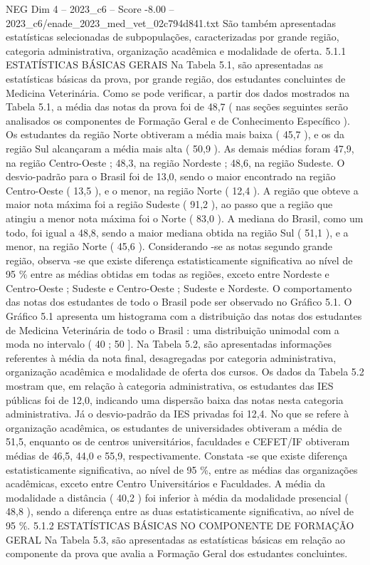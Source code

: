 \begin{textsample}{NEG Dim 4 – 2023\_c6 – Score -8.00 – 2023\_c6/enade\_2023\_med\_vet\_02c794d841.txt}
São também apresentadas estatísticas selecionadas de subpopulações, caracterizadas por grande região, categoria administrativa, organização acadêmica e modalidade de oferta. 5.1.1 ESTATÍSTICAS BÁSICAS GERAIS Na Tabela 5.1, são apresentadas as estatísticas básicas da prova, por grande região, dos estudantes concluintes de Medicina Veterinária.
Como se pode verificar, a partir dos dados mostrados na Tabela 5.1, a média das notas da prova foi de 48,7 ( nas seções seguintes serão analisados os componentes de Formação Geral e de Conhecimento Específico ).
Os estudantes da região Norte obtiveram a média mais baixa ( 45,7 ), e os da região Sul alcançaram a média mais alta ( 50,9 ).
As demais médias foram 47,9, na região Centro-Oeste ; 48,3, na região Nordeste ; 48,6, na região Sudeste.
O desvio-padrão para o Brasil foi de 13,0, sendo o maior encontrado na região Centro-Oeste ( 13,5 ), e o menor, na região Norte ( 12,4 ).
A região que obteve a maior nota máxima foi a região Sudeste ( 91,2 ), ao passo que a região que atingiu a menor nota máxima foi o Norte ( 83,0 ).
A mediana do Brasil, como um todo, foi igual a 48,8, sendo a maior mediana obtida na região Sul ( 51,1 ), e a menor, na região Norte ( 45,6 ).
Considerando -se as notas segundo grande região, observa -se que existe diferença estatisticamente significativa ao nível de 95 \% entre as médias obtidas em todas as regiões, exceto entre Nordeste e Centro-Oeste ; Sudeste e Centro-Oeste ; Sudeste e Nordeste.
O comportamento das notas dos estudantes de todo o Brasil pode ser observado no Gráfico 5.1.
O Gráfico 5.1 apresenta um histograma com a distribuição das notas dos estudantes de Medicina Veterinária de todo o Brasil : uma distribuição unimodal com a moda no intervalo ( 40 ; 50 ].
Na Tabela 5.2, são apresentadas informações referentes à média da nota final, desagregadas por categoria administrativa, organização acadêmica e modalidade de oferta dos cursos.
Os dados da Tabela 5.2 mostram que, em relação à categoria administrativa, os estudantes das IES públicas foi de 12,0, indicando uma dispersão baixa das notas nesta categoria administrativa.
Já o desvio-padrão da IES privadas foi 12,4.
No que se refere à organização acadêmica, os estudantes de universidades obtiveram a média de 51,5, enquanto os de centros universitários, faculdades e CEFET/IF obtiveram médias de 46,5, 44,0 e 55,9, respectivamente.
Constata -se que existe diferença estatisticamente significativa, ao nível de 95 \%, entre as médias das organizações acadêmicas, exceto entre Centro Universitários e Faculdades.
A média da modalidade a distância ( 40,2 ) foi inferior à média da modalidade presencial ( 48,8 ), sendo a diferença entre as duas estatisticamente significativa, ao nível de 95 \%. 5.1.2 ESTATÍSTICAS BÁSICAS NO COMPONENTE DE FORMAÇÃO GERAL Na Tabela 5.3, são apresentadas as estatísticas básicas em relação ao componente da prova que avalia a Formação Geral dos estudantes concluintes.

\end{textsample}
